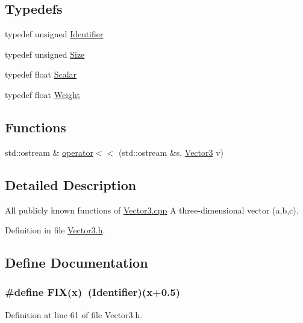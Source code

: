 \subsection*{Typedefs}
\begin{DoxyCompactItemize}
\item 
typedef unsigned \hyperlink{Vector3_8h_a25e0b8ddd193bb84ebf6c0eeff6b1c82}{Identifier}
\item 
typedef unsigned \hyperlink{Vector3_8h_a772b762114e74538c967388931c4a5e9}{Size}
\item 
typedef float \hyperlink{Vector3_8h_aacf5954d048aaaaef04620896706921d}{Scalar}
\item 
typedef float \hyperlink{Vector3_8h_ad8909b856fa70c7731c787994276fb03}{Weight}
\end{DoxyCompactItemize}
\subsection*{Functions}
\begin{DoxyCompactItemize}
\item 
std::ostream \& \hyperlink{Vector3_8h_a751d7222f22f7264709359319164fdcd}{operator$<$$<$} (std::ostream \&s, \hyperlink{classVector3}{Vector3} v)
\end{DoxyCompactItemize}


\subsection{Detailed Description}
All publicly known functions of \hyperlink{Vector3_8cpp}{Vector3.cpp} A three-\/dimensional vector (a,b,c). 

Definition in file \hyperlink{Vector3_8h_source}{Vector3.h}.



\subsection{Define Documentation}
\subsubsection[{FIX}]{\setlength{\rightskip}{0pt plus 5cm}\#define FIX(x)~({\bf Identifier})(x+0.5)}\label{Vector3_8h_a740431a9a1d25e39e670cd5f48454ce4}


Definition at line 61 of file Vector3.h.


